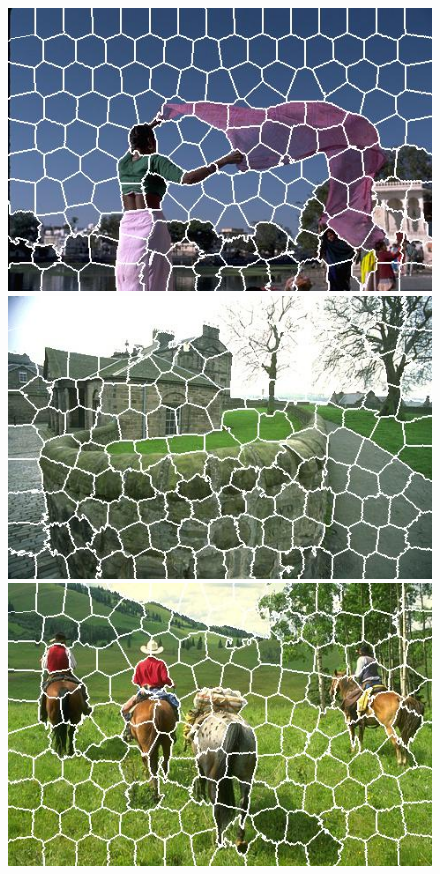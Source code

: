 \begin{figure}[h]
{\begin{minipage}[b]{0.13\linewidth}
\includegraphics[width=1\linewidth]{figures/img/SLIC/SLIC_80085.jpg}
\includegraphics[width=1\linewidth]{figures/img/SLIC/SLIC_92014.jpg}
\includegraphics[width=1\linewidth]{figures/img/SLIC/SLIC_220003.jpg}

\end{minipage}}
\end{figure}
